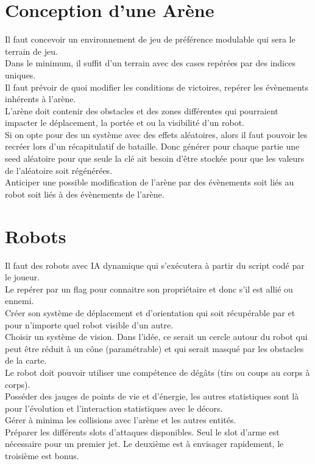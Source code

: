 \documentclass[10pt]{article}
\begin{document}
\section{Conception d'une Arène}

Il faut concevoir un environnement de jeu de préférence modulable qui sera le terrain de jeu.\\
Dans le minimum, il suffit d'un terrain avec des cases repérées par des indices uniques.\\
Il faut prévoir de quoi modifier les conditions de victoires, repérer les évènements inhérents à l'arène.\\
L'arène doit contenir des obstacles et des zones différentes qui pourraient impacter le déplacement, la portée et ou la visibilité d'un robot.\\
Si on opte pour des un système avec des effets aléatoires, alors il faut pouvoir les recréer lors d'un récapitulatif de bataille. Donc générer pour chaque partie une seed aléatoire pour que seule la clé ait besoin d'être stockée pour que les valeurs de l'aléatoire soit régénérées.\\
Anticiper une possible modification de l'arène par des évènements soit liés au robot soit liés à des évènements de l'arène.

\section{Robots}

Il faut des robots avec IA dynamique qui s'exécutera à partir du script codé par le joueur.\\
Le repérer par un flag pour connaitre son propriétaire et donc s'il est allié ou ennemi.\\
Créer son système de déplacement et d'orientation qui soit récupérable par et pour n'importe quel robot visible d'un autre.\\
Choisir un système de vision. Dans l'idée, ce serait un cercle autour du robot qui peut être réduit à un cône (paramétrable) et qui serait masqué par les obstacles de la carte.\\
Le robot doit pouvoir utiliser une compétence de dégâts (tirs ou coups au corps à corps).\\
Posséder des jauges de points de vie et d'énergie, les autres statistiques sont là pour l'évolution et l'interaction statistiques avec le décors. \\
Gérer à minima les collisions avec l'arène et les autres entités.\\
Préparer les différents slots d'attaques disponibles. Seul le slot d'arme est nécessaire pour un premier jet. Le deuxième est à envisager rapidement, le troisième est bonus.
\end{document}
